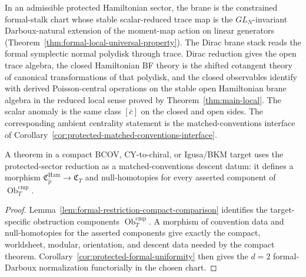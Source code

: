 \begin{rmk}
  In an admissible protected Hamiltonian sector, the brane is the
  constrained formal-stalk chart whose stable scalar-reduced trace map is
  the \(GL_N\)-invariant Darboux-natural extension of the moment-map
  action on linear generators
  (Theorem~\ref{thm:formal-local-universal-property}).  The Dirac brane
  stack reads the formal symplectic normal polydisk through trace.  Dirac
  reduction gives the open trace algebra, the closed Hamiltonian BF
  theory is the shifted cotangent theory of canonical transformations of
  that polydisk, and the closed observables identify with derived
  Poisson-central operations on the stable open Hamiltonian brane algebra
  in the reduced local sense proved by Theorem~\ref{thm:main-local}.  The
  scalar anomaly is the same class \( [\bar c] \) on the closed and open
  sides.  The corresponding ambient centrality statement is the
  matched-conventions interface of
  Corollary~\ref{cor:protected-matched-conventions-interface}.
\end{rmk}

\begin{cor}\label{cor:protected-matched-conventions-interface}
  A theorem in a compact BCOV, CY-to-chiral, or Igusa/BKM target uses the
  protected-sector reduction as a matched-conventions descent datum: it
  defines a morphism
  \(\mathfrak C_{\widehat p}^{\mathrm{Ham}}\to\mathfrak C_T\) and
  null-homotopies for every asserted component of
  \(\operatorname{Ob}^{\mathrm{cmp}}_T\).
\end{cor}

\begin{proof}
  Lemma~\ref{lem:formal-restriction-compact-comparison} identifies the
  target-specific obstruction components
  \(\operatorname{Ob}^{\mathrm{cmp}}_T\).  A morphism of convention
  data and null-homotopies for the asserted components give exactly
  the compact, worldsheet, modular, orientation, and descent data
  needed by the compact theorem.  Corollary~\ref{cor:protected-formal-uniformity}
  then gives the \(d=2\) formal-Darboux normalization functorially in the
  chosen chart.
\end{proof}
